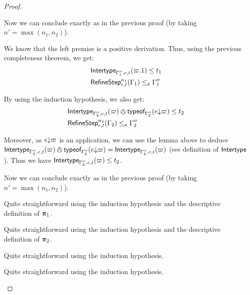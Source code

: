 \documentclass[a4paper]{article}
\theoremstyle{definition}
\begin{document}
\begin{proof}
\begin{description}
\begin{description}
        Now we can conclude exactly as in the previous proof (by taking $n'=\max (n_1,n_2)$).

        \item[\Rule{PAppL}] We know that the left premise is a positive derivation.
        Thus, using the previous completeness theorem, we get:
        \begin{align*}
          &\textsf{Intertype}_{\Gamma_1'',e,t} (\varpi.1) \leq t_1\\
          &\textsf{RefineStep}_{e,t}^{n_1} (\Gamma_1) \leq_{\!\scriptscriptstyle\mathcal{A}} \Gamma_1''
        \end{align*}

        By using the induction hypothesis, we also get:
        \begin{align*}
          &\env {\Gamma_2'',e,t} (\varpi) \tsand \tyof {\occ e {\varpi}} {\Gamma_2''} \leq t_2\\
          &\RefineStep {e,t}^{n_2} (\Gamma_2) \leqA \Gamma_2''
        \end{align*}

        Moreover, as $e{\downarrow}\varpi$ is an application, we can use the lemma above to deduce
        $\env {\Gamma_2'',e,t} (\varpi) \tsand \tyof {\occ e {\varpi}} {\Gamma_2''} = \env {\Gamma_2'',e,t} (\varpi)$
        (see definition of $\textsf{Intertype}_{}$).
        Thus we have $\textsf{Intertype}_{\Gamma_2'',e,t} (\varpi) \leq t_2$.

        Now we can conclude exactly as in the previous proof (by taking $n'=\max (n_1,n_2)$).

        \item[\Rule{PPairL}] Quite straightforward using the induction hypothesis and the descriptive definition of $\boldsymbol{\pi}_1$.
        \item[\Rule{PPairR}] Quite straightforward using the induction hypothesis and the descriptive definition of $\boldsymbol{\pi}_2$.
        \item[\Rule{PFst}] Quite straightforward using the induction hypothesis.
        \item[\Rule{PSnd}] Quite straightforward using the induction hypothesis.
      \end{description}
    \end{description}
  \end{proof}
\end{document}
